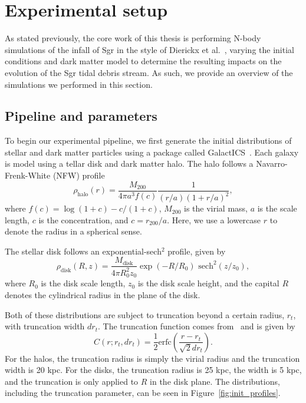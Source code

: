 \hypertarget{experimental-setup}{%
\chapter{Experimental setup}\label{experimental-setup}}

As stated previously, the core work of this thesis is performing N-body
simulations of the infall of Sgr in the style of Dierickx et
al.~\cite{dierickx_predicted_2017}, varying the initial conditions and dark
matter model to determine the resulting impacts on the evolution of the Sgr
tidal debris stream. As such, we provide an overview of the simulations we
performed in this section.

\hypertarget{pipeline-and-parameters}{%
\section{Pipeline and parameters}\label{pipeline-and-parameters}}

To begin our experimental pipeline, we first generate the initial
distributions of stellar and dark matter particles using a package called
GalactICS~\cite{deg_galactics_2019}. Each galaxy is model using a tellar disk
and dark matter halo. The halo follows a Navarro-Frenk-White (NFW) profile
\begin{equation}
    \rho_{\text{halo}} (r) = 
    \frac{M_{200}}{4\pi a^3 f(c)} 
    \frac{1}{(r/a)(1+r/a)^2},
\end{equation}
where $f(c) = \log (1+c) - c/(1+c)$, $M_{200}$ is the virial mass, $a$ is the
scale length, $c$ is the concentration, and $c = r_{200} / a$. Here, we use a
lowercase $r$ to denote the radius in a spherical sense.

The stellar disk follows an exponential-sech$^2$ profile, given by
\begin{equation}
    \rho_{\text{disk}} (R, z) = 
    \frac{M_{\text{disk}}}{4 \pi R_0^2 z_0}
    \exp(-R/R_0) \text{ sech}^2(z/z_0),
\end{equation}
where $R_0$ is the disk scale length, $z_0$ is the disk scale height, and the
capital $R$ denotes the cylindrical radius in the plane of the disk.

Both of these distributions are subject to truncation beyond a certain
radius, \(r_t\), with truncation width \(dr_t\). The truncation function
comes from~\cite{widrow_dynamical_2008} and is given by
\begin{equation}
C(r; r_t, dr_t) = \frac{1}{2} \text{erfc} 
\left( \frac{r - r_t}{\sqrt{2} dr_t} \right).
\end{equation}
For the halos, the truncation radius is simply the virial radius and the
truncation width is 20 kpc. For the disks, the truncation radius is 25 kpc,
the width is 5 kpc, and the truncation is only applied to $R$ in the disk
plane. The distributions, including the truncation parameter, can be seen in
Figure~\ref{fig:init_profiles}.

